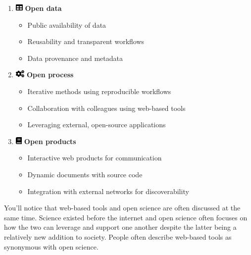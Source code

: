 \documentclass[
  letterpaper,
  DIV=11,
  numbers=noendperiod]{scrreprt}
\providecommand{\tightlist}{%
  \setlength{\itemsep}{0pt}\setlength{\parskip}{0pt}}\usepackage{longtable,booktabs,array}
\begin{document}
\begin{enumerate}
\def\labelenumi{\arabic{enumi}.}
\item
  \includegraphics[width=1em,height=1em]{./basics_files/figure-pdf/fa-icon-027224388e66831157840c588dc43741.pdf}
  \textbf{Open data}

  \begin{itemize}
  \tightlist
  \item
    Public availability of data
  \item
    Reusability and transparent workflows
  \item
    Data provenance and metadata
  \end{itemize}
\item
  \includegraphics[width=1.25em,height=1em]{./basics_files/figure-pdf/fa-icon-f702081e1a96180027748dfa6dd275a1.pdf}
  \textbf{Open process}

  \begin{itemize}
  \tightlist
  \item
    Iterative methods using reproducible workflows
  \item
    Collaboration with colleagues using web-based tools
  \item
    Leveraging external, open-source applications
  \end{itemize}
\item
  \includegraphics[width=0.88em,height=1em]{./basics_files/figure-pdf/fa-icon-ba6f5f2818a1e4c57b85400a286bb74c.pdf}
  \textbf{Open products}

  \begin{itemize}
  \tightlist
  \item
    Interactive web products for communication
  \item
    Dynamic documents with source code
  \item
    Integration with external networks for discoverability
  \end{itemize}
\end{enumerate}

You'll notice that web-based tools and open science are often discussed
at the same time. Science existed before the internet and open science
often focuses on how the two can leverage and support one another
despite the latter being a relatively new addition to society. People
often describe web-based tools as synonymous with open science.
\end{document}
